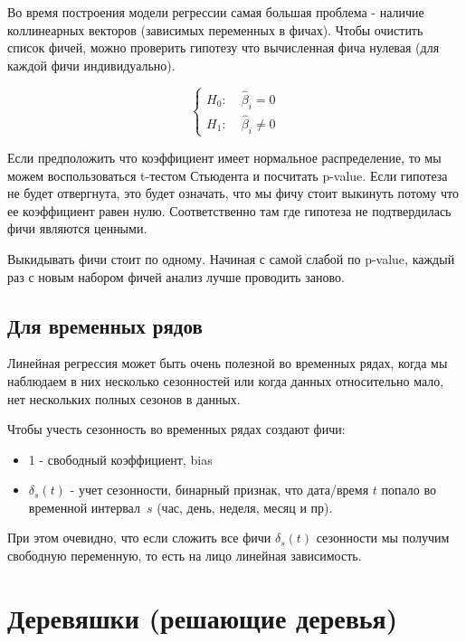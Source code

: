 \documentclass[a4paper, oneside]{book}
\begin{document}
Во время построения модели регрессии самая большая проблема - наличие коллинеарных векторов (зависимых переменных в фичах). Чтобы очистить список фичей, можно проверить гипотезу что вычисленная фича нулевая (для каждой фичи индивидуально). 

\begin{equation*}
    \label{eq:zero_coeff_hyp}
    \left\{
    \begin{array}{lr}
        H_0: & \; \hat \beta_i = 0 \\
        H_1: & \; \hat \beta_i \ne 0
    \end{array}
    \right.
\end{equation*}

Если предположить что коэффициент имеет нормальное распределение, то мы можем
воспользоваться t-тестом Стьюдента и посчитать p-value. Если гипотеза не будет
отвергнута, это будет означать, что мы фичу стоит выкинуть потому что ее
коэффициент равен нулю. Соответственно там где гипотеза не подтвердилась фичи
являются ценными.

Выкидывать фичи стоит по одному. Начиная с самой слабой по p-value, каждый раз
с новым набором фичей анализ лучше проводить заново.

\subsection{Для временных рядов}
Линейная регрессия может быть очень полезной во временных рядах, когда мы наблюдаем в них несколько сезонностей или когда данных относительно мало, нет нескольких полных сезонов в данных.

Чтобы учесть сезонность во временных рядах создают фичи:
\begin{itemize}
    \setlength\itemsep{0em}
    \item 1 - свободный коэффициент, bias
    \item $\delta_s(t)$ - учет сезонности, бинарный признак, что дата/время $t$ попало во временной интервал~$s$  (час, день, неделя, месяц и пр).
\end{itemize}
При этом очевидно, что если сложить все фичи $\delta_s(t)$ сезонности мы получим свободную переменную, то есть на лицо линейная зависимость. 

\section{Деревяшки (решающие деревья)}
\end{document}
